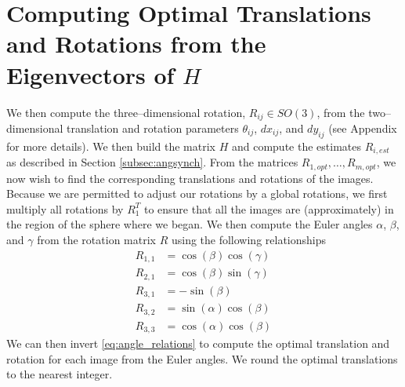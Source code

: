 \documentclass[11pt]{article}
\begin{document}
\section{Computing Optimal Translations and Rotations from the Eigenvectors of $H$}

We then compute the three--dimensional rotation, $R_{ij} \in SO(3)$, from the two--dimensional translation and rotation parameters $\theta_{ij}$, $dx_{ij}$, and $dy_{ij}$ (see Appendix for more details).
%
We then build the matrix $H$ and compute the estimates $R_{i, est}$ as described in Section \ref{subsec:angsynch}.
%
From the matrices $R_{1, opt}, \dots, R_{m, opt}$, we now wish to find the corresponding translations and rotations of the images.
%
Because we are permitted to adjust our rotations by a global rotations, we first multiply all rotations by $R_1^T$ to ensure that all the images are (approximately) in the region of the sphere where we began.
%
We then compute the Euler angles $\alpha$, $\beta$, and $\gamma$ from the rotation matrix $R$ using the following relationships
\begin{equation}
\begin{aligned}
R_{1,1} & = \cos(\beta)\cos(\gamma) \\
R_{2,1} & = \cos(\beta)\sin(\gamma) \\
R_{3,1} & = -\sin(\beta) \\
R_{3,2} & = \sin(\alpha)\cos(\beta) \\
R_{3,3} & = \cos(\alpha)\cos(\beta) 
\end{aligned}
\end{equation}
%
We can then invert \eqref{eq:angle_relations} to compute the optimal translation and rotation for each image from the Euler angles.
%
We round the optimal translations to the nearest integer.



\end{document}
